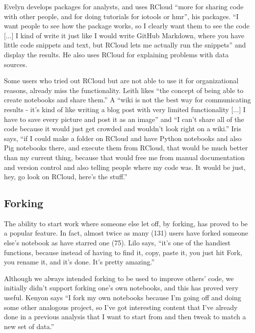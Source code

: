Evelyn develops packages for analysts, and uses RCloud ``more for sharing code with
other people, and for doing tutorials for iotools or hmr'', his packages.
``I want people to see how the package works, so I clearly want them
to see the code [...] I kind of write it just like I would write GitHub
Markdown, where you have little code snippets and text, but RCloud lets me
actually run the snippets'' and display the results. He also uses RCloud for
explaining problems with data sources.

Some users who tried out RCloud but are not able to use it for organizational
reasons, already miss the functionality. Leith likes ``the concept of being
able to create notebooks and share them.'' A ``wiki is not the best way for
communicating results - it's kind of like writing a blog post with very limited
functionality [...] I have to save every picture and post it as an image'' and
``I can't share all of the code because it would just get crowded and wouldn't
look right on a wiki.'' Iris says, ``if I could make a folder on RCloud and have
Python notebooks and also Pig notebooks there, and execute them from RCloud,
that would be much better than my current thing, because that would free me from
manual documentation and version control and also telling people where my code
was. It would be just, hey, go look on RCloud, here's the stuff.''



\subsection{Forking}
The ability to start work where someone else let off, by forking, has proved to
be a popular feature. In fact, almost twice as many (131) users have forked
someone else's notebook as have starred one (75).  Lilo says, ``it's one of the
handiest functions, because instead of having to find it, copy, paste it, you
just hit Fork, you rename it, and it's done. It's pretty amazing.''

Although we always intended forking to be used to improve others' code, we
initially didn't support forking one's own notebooks, and this has proved very
useful. Kenyon says ``I fork my own notebooks because I'm going off and doing some
other analogous project, so I've got interesting content that I've already done
in a previous analysis that I want to start from and then tweak to match a new
set of data.''

